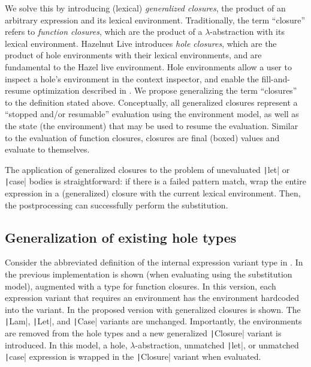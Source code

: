 We solve this by introducing (lexical) \textit{generalized closures}, the product of an arbitrary expression and its lexical environment. Traditionally, the term ``closure'' refers to \textit{function closures}, which are the product of a $\lambda$-abstraction with its lexical environment. Hazelnut Live introduces \textit{hole closures}, which are the product of hole environments with their lexical environments, and are fundamental to the Hazel live environment. Hole environments allow a user to inspect a hole's environment in the context inspector, and enable the fill-and-resume optimization described in . We propose generalizing the term ``closures'' to the definition stated above. Conceptually, all generalized closures represent a ``stopped and/or resumable'' evaluation using the environment model, as well as the state (the environment) that may be used to resume the evaluation. Similar to the evaluation of function closures, closures are final (boxed) values and evaluate to themselves.

The application of generalized closures to the problem of unevaluated \texttt|let| or \texttt|case| bodies is straightforward: if there is a failed pattern match, wrap the entire expression in a (generalized) closure with the current lexical environment. Then, the postprocessing can successfully perform the substitution.

\subsection{Generalization of existing hole types}
\label{sec:generalized-closures-datatypes}

Consider the abbreviated definition of the internal expression variant type in . In  the previous implementation is shown (when evaluating using the substitution model), augmented with a type for function closures. In this version, each expression variant that requires an environment has the environment hardcoded into the variant. In  the proposed version with generalized closures is shown. The \texttt|Lam|, \texttt|Let|, and \texttt|Case| variants are unchanged. Importantly, the environments are removed from the hole types and a new generalized \texttt|Closure| variant is introduced. In this model, a hole, $\lambda$-abstraction, unmatched \texttt|let|, or unmatched \texttt|case| expression is wrapped in the \texttt|Closure| variant when evaluated.

